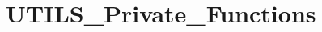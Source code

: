 \hypertarget{group___u_t_i_l_s___private___functions}{}\section{U\+T\+I\+L\+S\+\_\+\+Private\+\_\+\+Functions}
\label{group___u_t_i_l_s___private___functions}

